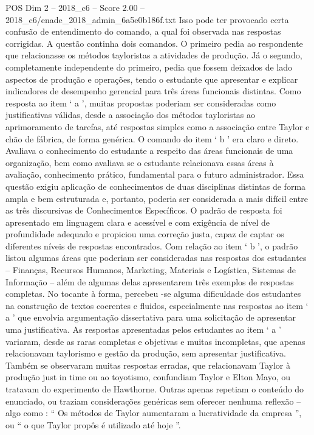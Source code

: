 \begin{textsample}{POS Dim 2 – 2018\_c6 – Score 2.00 – 2018\_c6/enade\_2018\_admin\_6a5e0b186f.txt}
Isso pode ter provocado certa confusão de entendimento do comando, a qual foi observada nas respostas corrigidas.
A questão continha dois comandos.
O primeiro pedia ao respondente que relacionasse os métodos tayloristas a atividades de produção.
Já o segundo, completamente independente do primeiro, pedia que fossem deixados de lado aspectos de produção e operações, tendo o estudante que apresentar e explicar indicadores de desempenho gerencial para três áreas funcionais distintas.
Como resposta ao item ‘ a ’, muitas propostas poderiam ser consideradas como justificativas válidas, desde a associação dos métodos tayloristas ao aprimoramento de tarefas, até respostas simples como a associação entre Taylor e chão de fábrica, de forma genérica.
O comando do item ‘ b ’ era claro e direto.
Avaliava o conhecimento do estudante a respeito das áreas funcionais de uma organização, bem como avaliava se o estudante relacionava essas áreas à avaliação, conhecimento prático, fundamental para o futuro administrador.
Essa questão exigiu aplicação de conhecimentos de duas disciplinas distintas de forma ampla e bem estruturada e, portanto, poderia ser considerada a mais difícil entre as três discursivas de Conhecimentos Específicos.
O padrão de resposta foi apresentado em linguagem clara e acessível e com exigência de nível de profundidade adequado e propiciou uma correção justa, capaz de captar os diferentes níveis de respostas encontrados.
Com relação ao item ‘ b ’, o padrão listou algumas áreas que poderiam ser consideradas nas respostas dos estudantes – Finanças, Recursos Humanos, Marketing, Materiais e Logística, Sistemas de Informação – além de algumas delas apresentarem três exemplos de respostas completas.
No tocante à forma, percebeu -se alguma dificuldade dos estudantes na construção de textos coerentes e fluidos, especialmente nas respostas ao item ‘ a ’ que envolvia argumentação dissertativa para uma solicitação de apresentar uma justificativa.
As respostas apresentadas pelos estudantes ao item ‘ a ’ variaram, desde as raras completas e objetivas e muitas incompletas, que apenas relacionavam taylorismo e gestão da produção, sem apresentar justificativa.
Também se observaram muitas respostas erradas, que relacionavam Taylor à produção just in time ou ao toyotismo, confundiam Taylor e Elton Mayo, ou tratavam do experimento de Hawthorne.
Outras apenas repetiam o conteúdo do enunciado, ou traziam considerações genéricas sem oferecer nenhuma reflexão – algo como : “ Os métodos de Taylor aumentaram a lucratividade da empresa ”, ou “ o que Taylor propôs é utilizado até hoje ”.

\end{textsample}
